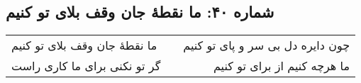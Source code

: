 \begin{center}
\section*{شماره ۴۰: ما نقطۀ جان وقف بلای تو کنیم}
\label{sec:040}
\begin{longtable}{l p{0.5cm} r}
ما نقطهٔ جان وقف بلای تو کنیم
&&
چون دایره دل بی سر و پای تو کنیم
\\
گر تو نکنی برای ما کاری راست
&&
ما هرچه کنیم از برای تو کنیم
\\
\end{longtable}
\end{center}
